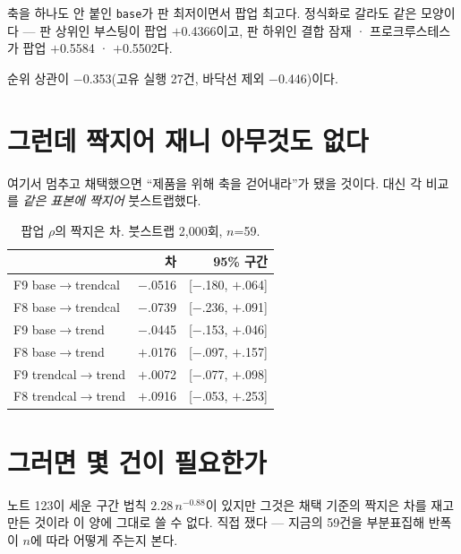 \documentclass[10pt]{article}
\begin{document}
축을 하나도 안 붙인 \texttt{base}가 판 최저이면서 팝업 최고다. 정식화로
갈라도 같은 모양이다 --- 판 상위인 부스팅이 팝업 $+$0.4366이고, 판 하위인
결합 잠재 · 프로크루스테스가 팝업 $+$0.5584 · $+$0.5502다.

순위 상관이 $-$0.353(고유 실행 27건, 바닥선 제외 $-$0.446)이다.

\section{그런데 짝지어 재니 아무것도 없다}

여기서 멈추고 채택했으면 ``제품을 위해 축을 걷어내라''가 됐을 것이다.
대신 각 비교를 \emph{같은 표본에 짝지어} 붓스트랩했다.

\begin{table}[t]
\centering\tsize
\caption{팝업 $\rho$의 짝지은 차. 붓스트랩 2{,}000회, $n$=59.}
\begin{tabular}{lrr}
\toprule
& 차 & 95\% 구간 \\
\midrule
F9 base$\to$trendcal & $-$.0516 & [$-$.180, $+$.064] \\
F8 base$\to$trendcal & $-$.0739 & [$-$.236, $+$.091] \\
F9 base$\to$trend & $-$.0445 & [$-$.153, $+$.046] \\
F8 base$\to$trend & $+$.0176 & [$-$.097, $+$.157] \\
F9 trendcal$\to$trend & $+$.0072 & [$-$.077, $+$.098] \\
F8 trendcal$\to$trend & $+$.0916 & [$-$.053, $+$.253] \\
\bottomrule
\end{tabular}
\end{table}


\section{그러면 몇 건이 필요한가}

노트 123이 세운 구간 법칙 $2.28\,n^{-0.88}$이 있지만 그것은 채택 기준의
짝지은 차를 재고 만든 것이라 이 양에 그대로 쓸 수 없다. 직접 쟀다 ---
지금의 59건을 부분표집해 반폭이 $n$에 따라 어떻게 주는지 본다.
\end{document}
